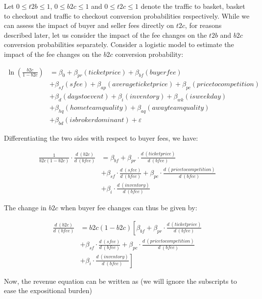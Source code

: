 \documentclass[letterpaper, 12pt]{article}
\begin{document}
Let $0\le  t2b \le 1$, $0 \le b2c \le 1$ and $0 \le t2c \le 1$ denote the traffic to basket, basket to checkout and traffic to checkout conversion probabilities respectively. While we can assess the impact of buyer and seller fees directly on $t2c$, for reasons described later, let us consider the impact of the fee changes on the $t2b$ and $b2c$ conversion probabilities separately. Consider a logistic model to estimate the impact of the fee changes on the $b2c$ conversion probability:

\begin{align*}
	\ln\left( \frac{b2c}{1-b2c} \right) &= \beta_0 + \beta_{pr}(ticketprice) + \beta_{bf}(buyerfee)\\
	&+ \beta_{sf}(sfee) + \beta_{ap}(averageticketprice) + \beta_{pc}(pricetocompetition)\\
	&+ \beta_{d}(daystoevent) + \beta_{i}(inventory) + \beta_{wk}(isweekday) \\
	&+ \beta_{hq}(hometeamquality) +  \beta_{aq}(awayteamquality) \\
	&+ \beta_{bd}(isbrokerdominant) + \varepsilon
\end{align*}

Differentiating the two sides with respect to buyer fees, we have:

\begin{align*}
	\frac{1}{b2c(1-b2c)} \cdot \frac{d\ (b2c)}{d\ (bfee)}&= \beta_{bf} + \beta_{pr} \cdot \frac{d\ (ticketprice)}{d\ (bfee)}\\ 
	& + \beta_{sf} \cdot \frac{d\ (sfee)}{d\ (bfee)} + \beta_{pc} \cdot \frac{d\ (pricetocompetition)}{d\ (bfee)} \\
	& + \beta_i \cdot \frac{d\ (inventory)}{d\ (bfee)}
\end{align*}

The change in $b2c$ when buyer fee changes can thus be given by:

\begin{align*}
\frac{d\ (b2c)}{d\ (bfee)}&=	b2c(1-b2c)\left[  \beta_{bf} + \beta_{pr} \cdot \frac{d\ (ticketprice)}{d\ (bfee)} \right. \\
&		 + \beta_{sf} \cdot \frac{d\ (sfee)}{d\ (bfee)} + \beta_{pc} \cdot \frac{d\ (pricetocompetition)}{d\ (bfee)} \\
&		 + \left. \beta_i \cdot \frac{d\ (inventory)}{d\ (bfee)}\right]
\end{align*}

Now, the revenue equation can be written as (we will ignore the subscripts to ease the expositional burden)
\end{document}
